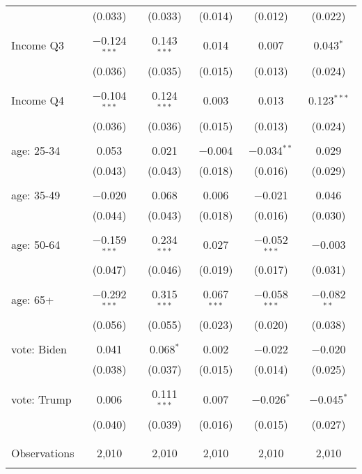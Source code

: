 \begin{tabular}{@{\extracolsep{5pt}}lccccc}
  & (0.033) & (0.033) & (0.014) & (0.012) & (0.022) \\ 
  & & & & & \\ 
 Income Q3 & $-$0.124$^{***}$ & 0.143$^{***}$ & 0.014 & 0.007 & 0.043$^{*}$ \\ 
  & (0.036) & (0.035) & (0.015) & (0.013) & (0.024) \\ 
  & & & & & \\ 
 Income Q4 & $-$0.104$^{***}$ & 0.124$^{***}$ & 0.003 & 0.013 & 0.123$^{***}$ \\ 
  & (0.036) & (0.036) & (0.015) & (0.013) & (0.024) \\ 
  & & & & & \\ 
 age: 25-34 & 0.053 & 0.021 & $-$0.004 & $-$0.034$^{**}$ & 0.029 \\ 
  & (0.043) & (0.043) & (0.018) & (0.016) & (0.029) \\ 
  & & & & & \\ 
 age: 35-49 & $-$0.020 & 0.068 & 0.006 & $-$0.021 & 0.046 \\ 
  & (0.044) & (0.043) & (0.018) & (0.016) & (0.030) \\ 
  & & & & & \\ 
 age: 50-64 & $-$0.159$^{***}$ & 0.234$^{***}$ & 0.027 & $-$0.052$^{***}$ & $-$0.003 \\ 
  & (0.047) & (0.046) & (0.019) & (0.017) & (0.031) \\ 
  & & & & & \\ 
 age: 65+ & $-$0.292$^{***}$ & 0.315$^{***}$ & 0.067$^{***}$ & $-$0.058$^{***}$ & $-$0.082$^{**}$ \\ 
  & (0.056) & (0.055) & (0.023) & (0.020) & (0.038) \\ 
  & & & & & \\ 
 vote: Biden & 0.041 & 0.068$^{*}$ & 0.002 & $-$0.022 & $-$0.020 \\ 
  & (0.038) & (0.037) & (0.015) & (0.014) & (0.025) \\ 
  & & & & & \\ 
 vote: Trump & 0.006 & 0.111$^{***}$ & 0.007 & $-$0.026$^{*}$ & $-$0.045$^{*}$ \\ 
  & (0.040) & (0.039) & (0.016) & (0.015) & (0.027) \\ 
  & & & & & \\ 
\hline \\[-1.8ex] 

Observations & 2,010 & 2,010 & 2,010 & 2,010 & 2,010 \\ 
\hline 
\hline \\[-1.8ex] 
\end{tabular} 